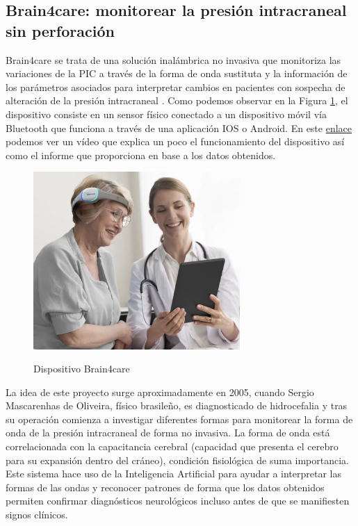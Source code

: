 \subsection{Brain4care: monitorear la presión intracraneal sin perforación \cite{b4c_art}}
Brain4care se trata de una solución inalámbrica no invasiva que monitoriza las variaciones de la PIC a través de la forma de onda sustituta y la información de los parámetros asociados para interpretar cambios en pacientes con sospecha de alteración de la presión intracraneal \cite{b4c}. Como podemos observar en la Figura \ref{fig:b4c}, el dispositivo consiste en un sensor físico conectado a un dispositivo móvil vía Bluetooth que funciona a través de una aplicación IOS o Android. En este \href{https://youtu.be/9uHtUKreXvc}{enlace} podemos ver un vídeo que explica un poco el funcionamiento del dispositivo así como el informe que proporciona en base a los datos obtenidos.
\begin{figure}[h]
    \centering
    \includegraphics[width=0.7\textwidth]{img/b4c.PNG}
    \caption{Dispositivo Brain4care}
    \cite{b4c}
    \label{fig:b4c}
\end{figure}
La idea de este proyecto surge aproximadamente en 2005, cuando Sergio Mascarenhas de Oliveira, físico brasileño, es diagnosticado de hidrocefalia y tras su operación comienza a investigar diferentes formas para monitorear la forma de onda de la presión intracraneal de forma no invasiva. La forma de onda está correlacionada con la capacitancia cerebral (capacidad que presenta el cerebro para su expansión dentro del cráneo), condición fisiológica de suma importancia.
Este sistema hace uso de la Inteligencia Artificial para ayudar a interpretar las formas de las ondas y reconocer patrones de forma que los datos obtenidos permiten confirmar diagnósticos neurológicos incluso antes de que se manifiesten signos clínicos.

